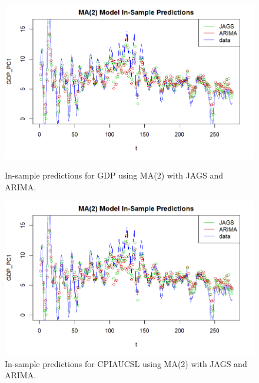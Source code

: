 \begin{figure}[H]
    \centering
    \begin{minipage}{0.49\textwidth}
        \centering
        \includegraphics[width=\textwidth]{images/3-MA/ARIMA_MA2_predictions_gdp.png}
        \caption{In-sample predictions for GDP using MA(2) with JAGS and ARIMA.}
        \label{fig:ARIMA_MA2_gdp_prediction}
    \end{minipage}\hfill
    \begin{minipage}{0.49\textwidth}
        \centering
        \includegraphics[width=\textwidth]{images/3-MA/ARIMA_MA2_predictions_gdp.png}
        \caption{In-sample predictions for CPIAUCSL using MA(2) with JAGS and ARIMA.}
        \label{fig:ARIMA_MA2_infl_prediction}
    \end{minipage}
\end{figure}
